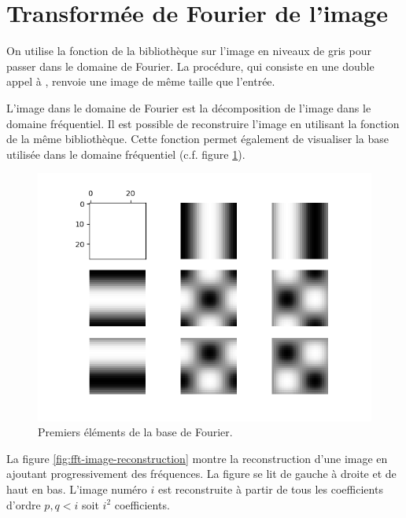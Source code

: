 \section{Transformée de Fourier de l'image}

On utilise la fonction  de la bibliothèque  sur 
l'image en niveaux de gris pour passer dans le domaine de Fourier.
La procédure, qui consiste en une double appel à , renvoie une image 
de même taille que l'entrée.

L'image dans le domaine de Fourier est la décomposition de l'image dans le domaine 
fréquentiel.
Il est possible de reconstruire l'image en utilisant la 
fonction  de la même bibliothèque.
Cette fonction permet également de visualiser la base utilisée dans le domaine 
fréquentiel (c.f.\/ figure \ref{fig:freq-basis}).

\begin{figure}[h]
  \centering
  \includegraphics[scale=0.6]{assets/fft-basis}
  \caption{Premiers éléments de la base de Fourier.}
  \label{fig:freq-basis}
\end{figure}

La figure \ref{fig:fft-image-reconstruction} montre la reconstruction d'une 
image en ajoutant progressivement des fréquences.
La figure se lit de gauche à droite et de haut en bas. 
L'image numéro $i$ est reconstruite à partir de tous les coefficients 
d'ordre $p,q < i$ soit $i^2$ coefficients.

